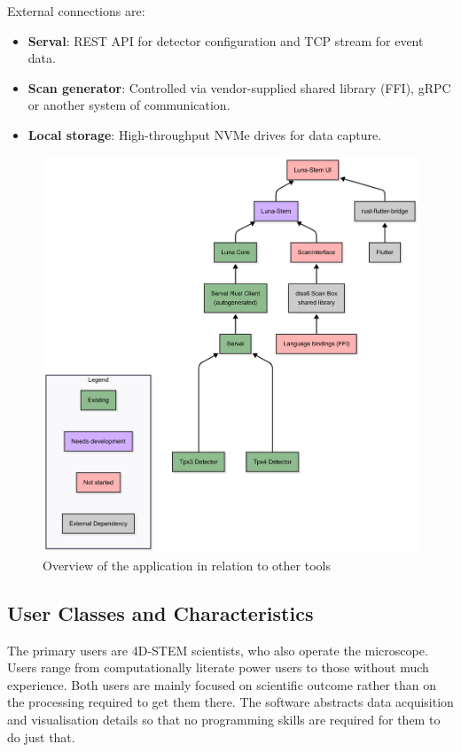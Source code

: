 \documentclass[10pt]{article}
\begin{document}
External connections are:
\begin{itemize}
    \item \textbf{Serval}: REST API for detector configuration and TCP stream for event data.
    \item \textbf{Scan generator}: Controlled via vendor-supplied shared library (FFI), gRPC or another system of communication.
    \item \textbf{Local storage}: High-throughput NVMe drives for data capture.
\end{itemize}

\begin{figure}[t]
    \centering
    \includegraphics[width=0.7\linewidth]{GeneralStructure}
    \caption{Overview of the application in relation to other tools}
    \label{fig:general_structure}
\end{figure}

\subsection{User Classes and Characteristics}\label{subsec:user-classes-and-characteristics}
The primary users are 4D-STEM scientists, who also operate the microscope. Users range from computationally literate power users to those without much experience. Both users are mainly focused on scientific outcome rather than on the processing required to get them there. The software abstracts data acquisition and visualisation details so that no programming skills are required for them to do just that.
\end{document}
